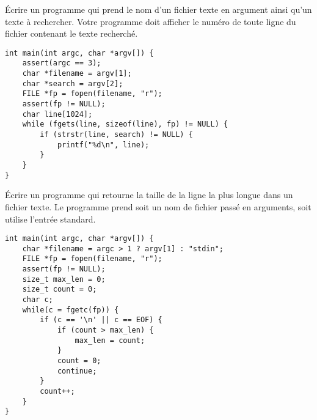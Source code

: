 \documentclass[french,a4paper,addpoints,11pt]{exam}
\begin{document}
\begin{questions}
\question Écrire un programme qui prend le nom d'un fichier texte en argument ainsi qu'un texte à rechercher. Votre programme doit afficher le numéro de toute ligne du fichier contenant le texte recherché.

\begin{solutionordottedlines}[10cm]
\begin{lstlisting}
int main(int argc, char *argv[]) {
    assert(argc == 3);
    char *filename = argv[1];
    char *search = argv[2];
    FILE *fp = fopen(filename, "r");
    assert(fp != NULL);
    char line[1024];
    while (fgets(line, sizeof(line), fp) != NULL) {
        if (strstr(line, search) != NULL) {
            printf("%d\n", line);
        }
    }
}
\end{lstlisting}
\end{solutionordottedlines}

\question Écrire un programme qui retourne la taille de la ligne la plus longue dans un fichier texte. Le programme prend soit un nom de fichier passé en arguments, soit utilise l'entrée standard. 

\begin{solutionordottedlines}[10cm]
\begin{lstlisting}
int main(int argc, char *argv[]) {
    char *filename = argc > 1 ? argv[1] : "stdin";        
    FILE *fp = fopen(filename, "r");
    assert(fp != NULL);
    size_t max_len = 0;
    size_t count = 0;
    char c;
    while(c = fgetc(fp)) {
        if (c == '\n' || c == EOF) {
            if (count > max_len) {
                max_len = count;
            }
            count = 0;
            continue;
        }
        count++;
    }    
}
\end{lstlisting}
\end{solutionordottedlines}


\end{questions}
\end{document}
